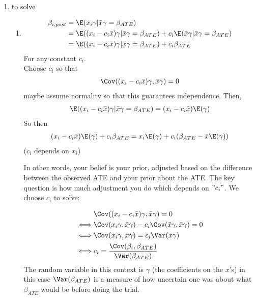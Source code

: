 \begin{enumerate}
	\item to solve
		\begin{enumerate}
			\item
				\begin{align*}
					\beta_{i,post} & = \E (x_i \gamma | \bar x \gamma = \beta_{ATE})                                                                        \\
								   & = \E((x_i - c_i \bar{x}) \gamma | \bar{x} \gamma = \beta_{ATE}) + c_i \E(\bar{x} \gamma | \bar{x} \gamma = \beta_{ATE}) \\
								   & = \E((x_{i} - c_i \bar{x}) \gamma | \bar{x} \gamma = \beta_{ATE}) + c_i \beta_{ATE}                                       \\
				\end{align*}
				For any constant $c_i$. \\
				Choose $c_i$ so that 
				\begin{align*}
					\Cov((x_{i} - c_i \bar{x})\gamma, \bar{x} \gamma) = 0
				\end{align*} 
				maybe assume normality so that this guarantees independence.
				Then,
				\begin{align*}
					\E((x_i - c_i \bar{x}) \gamma | \bar{x} \gamma = \beta_{ATE}) = (x_{i} - c_i \bar{x}) \E(\gamma)
				\end{align*}
				So then
				\begin{align*}
					(x_i - c_i \bar{x}) \E(\gamma) + c_i \beta_{ATE} = x_i \E(\gamma) + c_i (\beta_{ATE} - \bar{x} \E(\gamma))
				\end{align*} 
				($c_i$ depends on $x_i$)

				In other words, your belief is your prior, adjusted based on the difference between the observed ATE and your prior about the ATE.
				The key question is how much adjustment you do which depends on $"c_i"$. We choose $c_i$ to solve:

				\begin{align*}
                          & \Cov ((x_i - c_i \bar{x}) \gamma, \bar{x} \gamma) = 0                          \\
				 \iff     & \Cov(x_i \gamma, \bar{x} \gamma) -c_i \Cov(\bar{x} \gamma, \bar{x} \gamma) = 0 \\
					\iff  & \Cov(x_i \gamma, \bar{x} \gamma) = c_i \Var(\bar{x} \gamma)                  \\
				\iff & c_i = \frac{\Cov(\beta_i, \beta_{ATE}) }{ \Var(\beta_{ATE})}
				\end{align*} 
				The random variable in this context is $\gamma$ (the coefficients on the $x $'s) in this case $\Var(\beta_{ATE})$ is a measure of how uncertain one was about what $\beta_{ATE}$ would be before doing the trial.


\end{enumerate}
\end{enumerate}
